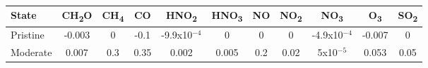 \begin{table}[H]
    \centering
\begin{tabular}{lcccccccccc}\hline
    State         &   CH\textsubscript{2}O    &  CH\textsubscript{4}  &   CO      &   HNO\textsubscript{2}    &   HNO\textsubscript{3}    &   NO  &   NO\textsubscript{2} &   NO\textsubscript{3} &   O\textsubscript{3}  &   SO\textsubscript{2} \\\hline
    Pristine    &   -0.003                  &   0                   &   -0.1    &   -9.9x10$^{-4}$          &   0                       &   0   &   0                   &   -4.9x10$^{-4}$      &   -0.007              &   0                   \\
    Moderate    &   0.007                   &   0.3                 &   0.35    &   0.002                   &   0.005                   &   0.2 &   0.02                &   5x10$^{-5}$         &   0.053               &   0.05                \\\hline
\end{tabular}
\caption{}
\label{table:states}
\end{table}